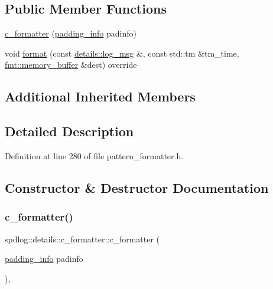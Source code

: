 \subsection*{Public Member Functions}
\begin{DoxyCompactItemize}
\item 
\hyperlink{classspdlog_1_1details_1_1c__formatter_aa16ea42a3648637a5223ed85d711aa50}{c\+\_\+formatter} (\hyperlink{structspdlog_1_1details_1_1padding__info}{padding\+\_\+info} padinfo)
\item 
void \hyperlink{classspdlog_1_1details_1_1c__formatter_a1b09d9e9e1d84b29fc2fb8d37fa07d57}{format} (const \hyperlink{structspdlog_1_1details_1_1log__msg}{details\+::log\+\_\+msg} \&, const std\+::tm \&tm\+\_\+time, \hyperlink{format_8h_a21cbf729f69302f578e6db21c5e9e0d2}{fmt\+::memory\+\_\+buffer} \&dest) override
\end{DoxyCompactItemize}
\subsection*{Additional Inherited Members}


\subsection{Detailed Description}


Definition at line 280 of file pattern\+\_\+formatter.\+h.



\subsection{Constructor \& Destructor Documentation}
\mbox{\label{classspdlog_1_1details_1_1c__formatter_aa16ea42a3648637a5223ed85d711aa50}} 
\subsubsection{\texorpdfstring{c\+\_\+formatter()}{c\_formatter()}}
{\footnotesize\ttfamily spdlog\+::details\+::c\+\_\+formatter\+::c\+\_\+formatter (\begin{DoxyParamCaption}\item[{\hyperlink{structspdlog_1_1details_1_1padding__info}{padding\+\_\+info}}]{padinfo }\end{DoxyParamCaption})\hspace{0.3cm}{\ttfamily [inline]}, {\ttfamily [explicit]}}




